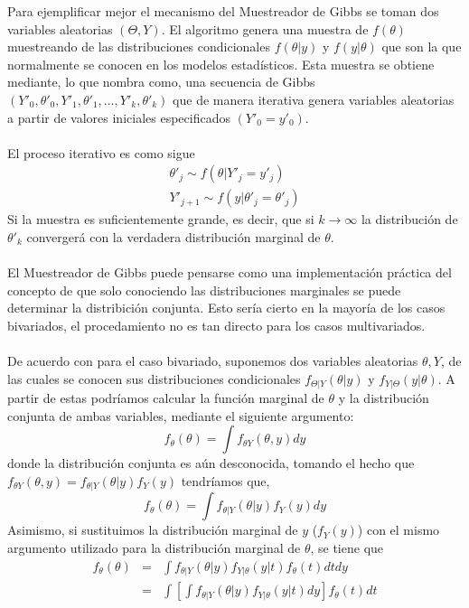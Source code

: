 Para ejemplificar mejor el mecanismo del Muestreador de Gibbs se toman dos variables aleatorias $(\Theta,Y)$. El algoritmo genera una muestra de $f(\theta)$ muestreando de las distribuciones condicionales $f(\theta|y)$ y $f(y|\theta)$ que son la que normalmente se conocen en los modelos estad\'isticos. Esta muestra se obtiene mediante, lo que \cite{casella1992explaining} nombra como, una secuencia de Gibbs $(Y'_0,\theta'_0,Y'_1,\theta'_1,...,Y'_k,\theta'_k)$ que de manera iterativa genera variables aleatorias a partir de valores iniciales especificados $(Y'_0=y'_0)$.\\
\\El proceso iterativo es como sigue\\
\begin{align*}
\theta'_j \sim f(\theta|Y'_j=y'_j)\\
Y'_{j+1} \sim f(y|\theta'_j=\theta'_j)
\end{align*}
Si la muestra es suficientemente grande, es decir, que si $k \rightarrow \infty$ la distribuci\'on de $\theta'_k$ converger\'a con la verdadera distribuci\'on marginal de $\theta$.\\
\\
El Muestreador de Gibbs puede pensarse como una implementaci\'on pr\'actica del concepto de que solo conociendo las distribuciones marginales se puede determinar la distribici\'on conjunta. Esto ser\'ia cierto en la mayor\'ia de los casos bivariados, el procedamiento no es tan directo para los casos multivariados.\\
\\
De acuerdo con \cite{casella1992explaining} para el caso bivariado, suponemos dos variables aleatorias $\theta,Y$, de las cuales se conocen sus distribuciones condicionales $f_{\Theta|Y}(\theta|y)$ y $f_{Y|\Theta}(y|\theta)$. A partir de estas podr\'iamos calcular la funci\'on marginal de $\theta$ y la distribuci\'on conjunta de ambas variables, mediante  el siguiente argumento:\\
\[f_\theta(\theta)=\int f_{\theta Y}(\theta,y)dy\]
donde la distribuci\'on conjunta es a\'un desconocida, tomando el hecho que $f_{\theta Y}(\theta,y)=f_{\theta|Y}(\theta|y)f_Y(y)$ tendr\'iamos que,\\
\[f_\theta(\theta)=\int f_{\theta|Y}(\theta|y)f_Y(y) dy\]
Asimismo, si sustituimos la distribuci\'on marginal de $y$ ($f_Y(y)$) con el mismo argumento utilizado para la distribuci\'on marginal de $\theta$, se tiene que
\begin{eqnarray*}
f_\theta(\theta) &=& \int f_{\theta|Y}(\theta|y) f_{Y|\theta}(y|t) f_\theta(t)dt dy\\
       &=& \int [ \int  f_{\theta|Y}(\theta|y)f_{Y|\theta}(y|t) dy]  f_\theta(t) dt
\end{eqnarray*}
